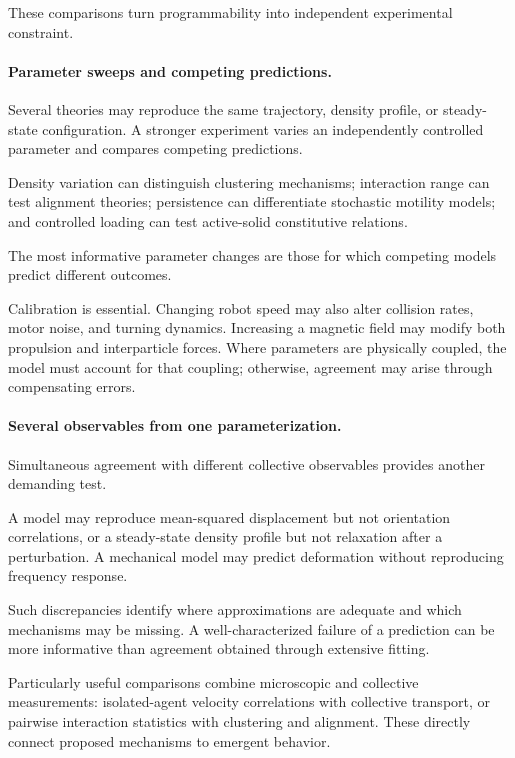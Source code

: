 These comparisons turn programmability
into independent experimental constraint.

\paragraph*{Parameter sweeps and competing predictions.}

Several theories may reproduce the same
trajectory, density profile, or steady-state
configuration. A stronger experiment varies
an independently controlled parameter
and compares competing predictions.

Density variation can distinguish clustering
mechanisms; interaction range can test
alignment theories; persistence can
differentiate stochastic motility models;
and controlled loading can test
active-solid constitutive relations.

The most informative parameter changes
are those for which competing models
predict different outcomes.

Calibration is essential. Changing robot
speed may also alter collision rates,
motor noise, and turning dynamics.
Increasing a magnetic field may modify
both propulsion and interparticle forces.
Where parameters are physically coupled,
the model must account for that coupling;
otherwise, agreement may arise through
compensating errors.

\paragraph*{Several observables from one parameterization.}

Simultaneous agreement with different
collective observables provides another
demanding test.

A model may reproduce mean-squared
displacement but not orientation
correlations, or a steady-state
density profile but not relaxation
after a perturbation. A mechanical
model may predict deformation
without reproducing frequency response.

Such discrepancies identify where
approximations are adequate and
which mechanisms may be missing.
A well-characterized failure of a
prediction can be more informative
than agreement obtained through
extensive fitting.

Particularly useful comparisons
combine microscopic and collective
measurements: isolated-agent velocity
correlations with collective transport,
or pairwise interaction statistics
with clustering and alignment.
These directly connect proposed
mechanisms to emergent behavior.

